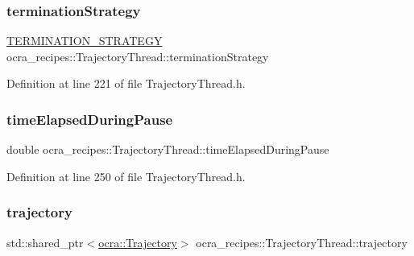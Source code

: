 \subsubsection{\texorpdfstring{termination\+Strategy}{terminationStrategy}}
{\footnotesize\ttfamily \hyperlink{namespaceocra__recipes_afcf7ca623a6c39b246aa4bda629c7309}{T\+E\+R\+M\+I\+N\+A\+T\+I\+O\+N\+\_\+\+S\+T\+R\+A\+T\+E\+GY} ocra\+\_\+recipes\+::\+Trajectory\+Thread\+::termination\+Strategy\hspace{0.3cm}{\ttfamily [protected]}}



Definition at line 221 of file Trajectory\+Thread.\+h.

\hypertarget{classocra__recipes_1_1TrajectoryThread_a3aa38677a7e98b6a6deec0b29a903844}{}\label{classocra__recipes_1_1TrajectoryThread_a3aa38677a7e98b6a6deec0b29a903844} 
\subsubsection{\texorpdfstring{time\+Elapsed\+During\+Pause}{timeElapsedDuringPause}}
{\footnotesize\ttfamily double ocra\+\_\+recipes\+::\+Trajectory\+Thread\+::time\+Elapsed\+During\+Pause\hspace{0.3cm}{\ttfamily [protected]}}



Definition at line 250 of file Trajectory\+Thread.\+h.

\hypertarget{classocra__recipes_1_1TrajectoryThread_a87ec388c22716d82bca31dbf89a21cb3}{}\label{classocra__recipes_1_1TrajectoryThread_a87ec388c22716d82bca31dbf89a21cb3} 
\subsubsection{\texorpdfstring{trajectory}{trajectory}}
{\footnotesize\ttfamily std\+::shared\+\_\+ptr$<$\hyperlink{classocra_1_1Trajectory}{ocra\+::\+Trajectory}$>$ ocra\+\_\+recipes\+::\+Trajectory\+Thread\+::trajectory\hspace{0.3cm}{\ttfamily [protected]}}




